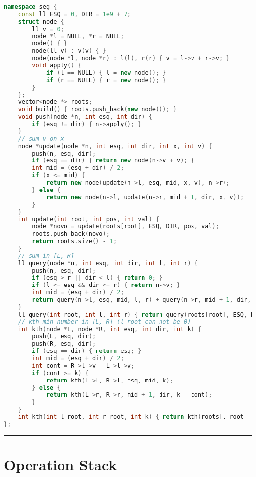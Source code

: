 \documentclass[11pt, a4paper, twoside]{book}
\begin{document}
\begin{lstlisting}[language=C++]
namespace seg {
    const ll ESQ = 0, DIR = 1e9 + 7;
    struct node {
        ll v = 0;
        node *l = NULL, *r = NULL;
        node() { }
        node(ll v) : v(v) { }
        node(node *l, node *r) : l(l), r(r) { v = l->v + r->v; }
        void apply() {
            if (l == NULL) { l = new node(); }
            if (r == NULL) { r = new node(); }
        }
    };
    vector<node *> roots;
    void build() { roots.push_back(new node()); }
    void push(node *n, int esq, int dir) {
        if (esq != dir) { n->apply(); }
    }
    // sum v on x
    node *update(node *n, int esq, int dir, int x, int v) {
        push(n, esq, dir);
        if (esq == dir) { return new node(n->v + v); }
        int mid = (esq + dir) / 2;
        if (x <= mid) {
            return new node(update(n->l, esq, mid, x, v), n->r);
        } else {
            return new node(n->l, update(n->r, mid + 1, dir, x, v));
        }
    }
    int update(int root, int pos, int val) {
        node *novo = update(roots[root], ESQ, DIR, pos, val);
        roots.push_back(novo);
        return roots.size() - 1;
    }
    // sum in [L, R]
    ll query(node *n, int esq, int dir, int l, int r) {
        push(n, esq, dir);
        if (esq > r || dir < l) { return 0; }
        if (l <= esq && dir <= r) { return n->v; }
        int mid = (esq + dir) / 2;
        return query(n->l, esq, mid, l, r) + query(n->r, mid + 1, dir, l, r);
    }
    ll query(int root, int l, int r) { return query(roots[root], ESQ, DIR, l, r); }
    // kth min number in [L, R] (l_root can not be 0)
    int kth(node *L, node *R, int esq, int dir, int k) {
        push(L, esq, dir);
        push(R, esq, dir);
        if (esq == dir) { return esq; }
        int mid = (esq + dir) / 2;
        int cont = R->l->v - L->l->v;
        if (cont >= k) {
            return kth(L->l, R->l, esq, mid, k);
        } else {
            return kth(L->r, R->r, mid + 1, dir, k - cont);
        }
    }
    int kth(int l_root, int r_root, int k) { return kth(roots[l_root - 1], roots[r_root], ESQ, DIR, k); }
};
\end{lstlisting}

\hfill

\rule{\textwidth}{0.4pt}

\section{Operation Stack}
\end{document}
